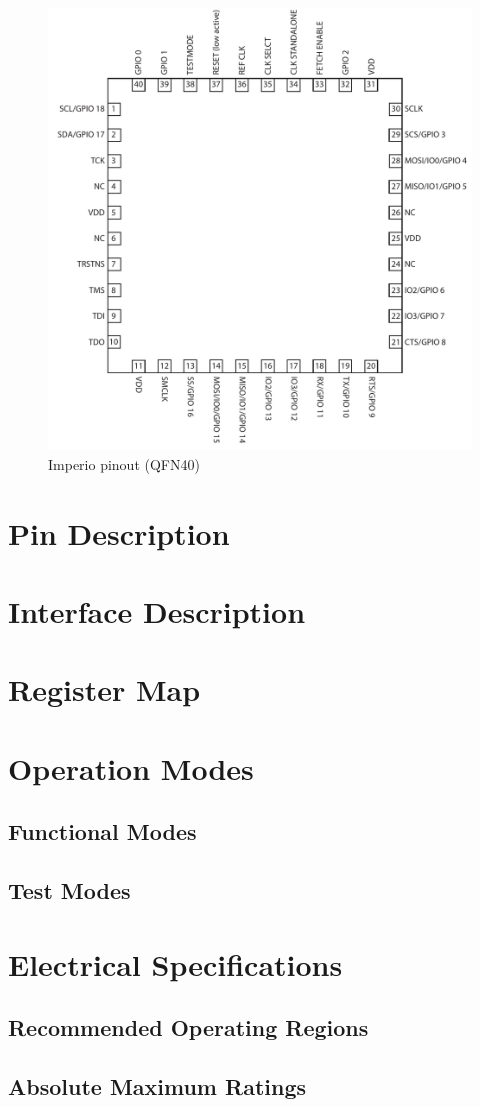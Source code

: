 \begin{figure}[htbp]
  \centering \includegraphics[width=1.0\textwidth]{./figures/pinout_imperio}
  \caption{Imperio pinout (QFN40)}
\end{figure}

\section{Pin Description}

\section{Interface Description}

\section{Register Map}

\section{Operation Modes}

\subsection{Functional Modes}
\subsection{Test Modes}

\section{Electrical Specifications}
\subsection{Recommended Operating Regions}
\subsection{Absolute Maximum Ratings}
